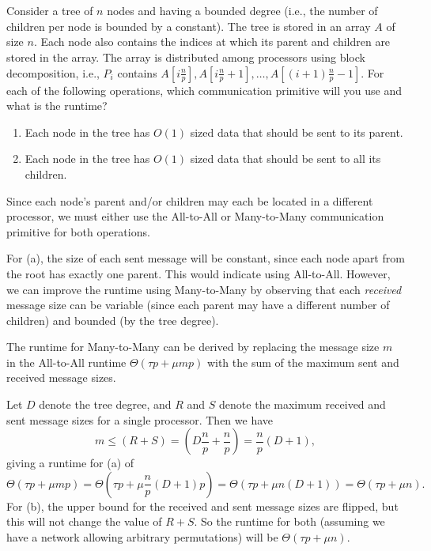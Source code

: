 \documentclass{article}
\begin{document}
\section{}
Consider a tree of $n$ nodes and having a bounded degree (i.e., the number of children per node is bounded by a constant).
The tree is stored in an array $A$ of size $n$.
Each node also contains the indices at which its parent and children are stored in the array.
The array is distributed among processors using block decomposition, i.e., $P_i$ contains $A[i\frac{n}{p}],A[i\frac{n}{p} + 1], \dots, A[(i + 1)\frac{n}{p} - 1].$
For each of the following operations, which communication primitive will you use and what is the runtime?

\begin{enumerate}[label=(\alph*)]
  \item Each node in the tree has $O(1)$ sized data that should be sent to its parent.
  \item Each node in the tree has $O(1)$ sized data that should be sent to all its children.
\end{enumerate}

\quad Since each node's parent and/or children may each be located in a different processor, we must either use the All-to-All or Many-to-Many communication primitive for both operations.

For (a), the size of each sent message will be constant, since each node apart from the root has exactly one parent.
This would indicate using All-to-All.
However, we can improve the runtime using Many-to-Many by observing that each \textit{received} message size can be variable (since each parent may have a different number of children) and bounded (by the tree degree).

The runtime for Many-to-Many can be derived by replacing the message size $m$ in the All-to-All runtime $\Theta(\tau p + \mu m p)$ with the sum of the maximum sent and received message sizes.

Let $D$ denote the tree degree, and $R$ and $S$ denote the maximum received and sent message sizes for a single processor.
Then we have
$$m \leq (R + S) = \left(D\dfrac{n}{p} + \dfrac{n}{p}\right) = \dfrac{n}{p}(D+1),$$
giving a runtime for (a) of
$$\Theta(\tau p + \mu m p) = \Theta(\tau p + \mu \dfrac{n}{p}(D+1) p) = \Theta(\tau p + \mu n(D+1)) = \Theta(\tau p + \mu n).$$
For (b), the upper bound for the received and sent message sizes are flipped, but this will not change the value of $R + S$.
So the runtime for both (assuming we have a network allowing arbitrary permutations) will be $\Theta(\tau p + \mu n)$.
\end{document}

